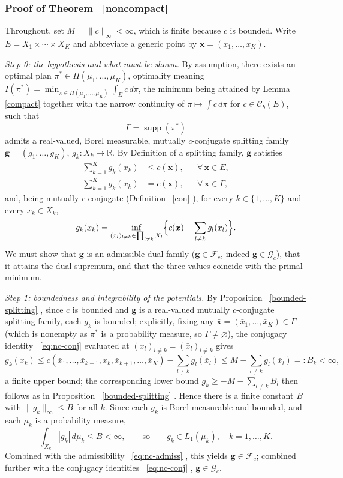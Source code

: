 \documentclass[twoside,11pt,a4paper]{article}
\newcommand*{\SavedEqref}{}
\let\SavedEqref\eqref
\renewcommand*{\eqref}[1]{  \begingroup
    \hypersetup{
      linkcolor=linkequation,
      linkbordercolor=linkequation,
    }    \SavedEqref{#1}  \endgroup
}
\newcommand*{\SavedRef}{}
\let\SavedRef\ref
\renewcommand*{\ref}[1]{  \begingroup
    \hypersetup{
      linkcolor=linkequation,
      linkbordercolor=linkequation,
    }    \SavedRef{#1}  \endgroup
}
\begin{document}
\subsubsection*{Proof of Theorem~\ref{noncompact}}

Throughout, set $M=\|c\|_\infty<\infty$, which is finite because $c$ is bounded.
Write $E=X_1\times\cdots\times X_K$ and abbreviate a generic point by
$\boldsymbol x=(x_1,\dots,x_K)$.

\medskip
\noindent\emph{Step 0: the hypothesis and what must be shown.}
By assumption, there exists an optimal plan
$\pi^*\in\Pi(\mu_1,\dots,\mu_K)$, optimality meaning
$I(\pi^*)=\min_{\pi\in\Pi(\mu_1,\dots,\mu_K)}\int_E c\,d\pi$, the minimum being
attained by Lemma~\ref{compact} together with the narrow continuity of
$\pi\mapsto\int c\,d\pi$ for $c\in\mathcal C_b(E)$, such that
\[
\Gamma=\operatorname{supp}(\pi^*)
\]
admits a real-valued, Borel measurable, mutually $c$-conjugate splitting family
$\boldsymbol g=(g_1,\dots,g_K)$, $g_k:X_k\to\mathbb R$. By Definition of a
splitting family, $\boldsymbol g$ satisfies
\begin{align}
\sum_{k=1}^K g_k(x_k)&\le c(\boldsymbol x), &&\forall\,\boldsymbol x\in E,
\label{eq:nc-admiss}\\
\sum_{k=1}^K g_k(x_k)&= c(\boldsymbol x), &&\forall\,\boldsymbol x\in\Gamma,
\label{eq:nc-satur}
\end{align}
and, being mutually $c$-conjugate (Definition~\ref{con}), for every
$k\in\{1,\dots,K\}$ and every $x_k\in X_k$,
\begin{equation}\label{eq:nc-conj}
g_k(x_k)=\inf_{(x_l)_{l\ne k}\in\prod_{l\ne k}X_l}
\Bigl\{c(\boldsymbol x)-\sum_{l\ne k}g_l(x_l)\Bigr\}.
\end{equation}
We must show that $\boldsymbol g$ is an admissible dual family
($\boldsymbol g\in\mathcal F_c$, indeed $\boldsymbol g\in\mathcal G_c$), that it
attains the dual supremum, and that the three values coincide with the primal
minimum.

\medskip
\noindent\emph{Step 1: boundedness and integrability of the potentials.}
By Proposition~\ref{bounded-splitting}, since $c$ is bounded and
$\boldsymbol g$ is a real-valued mutually $c$-conjugate splitting family, each
$g_k$ is bounded; explicitly, fixing any
$\bar{\boldsymbol x}=(\bar x_1,\dots,\bar x_K)\in\Gamma$ (which is nonempty as
$\pi^*$ is a probability measure, so $\Gamma\ne\varnothing$), the conjugacy
identity~\eqref{eq:nc-conj} evaluated at $(x_l)_{l\ne k}=(\bar x_l)_{l\ne k}$ gives
\[
g_k(x_k)\le c(\bar x_1,\dots,\bar x_{k-1},x_k,\bar x_{k+1},\dots,\bar x_K)
-\sum_{l\ne k}g_l(\bar x_l)\le M-\sum_{l\ne k}g_l(\bar x_l)=:B_k<\infty,
\]
a finite upper bound; the corresponding lower bound
$g_k\ge -M-\sum_{l\ne k}B_l$ then follows as in
Proposition~\ref{bounded-splitting}. Hence there is a finite constant $B$ with
$\|g_k\|_\infty\le B$ for all $k$. Since each $g_k$ is Borel measurable and
bounded, and each $\mu_k$ is a probability measure,
\[
\int_{X_k}|g_k|\,d\mu_k\le B<\infty,\qquad\text{so}\qquad g_k\in L_1(\mu_k),
\quad k=1,\dots,K.
\]
Combined with the admissibility~\eqref{eq:nc-admiss}, this yields
$\boldsymbol g\in\mathcal F_c$; combined further with the conjugacy
identities~\eqref{eq:nc-conj}, $\boldsymbol g\in\mathcal G_c$.
\end{document}
